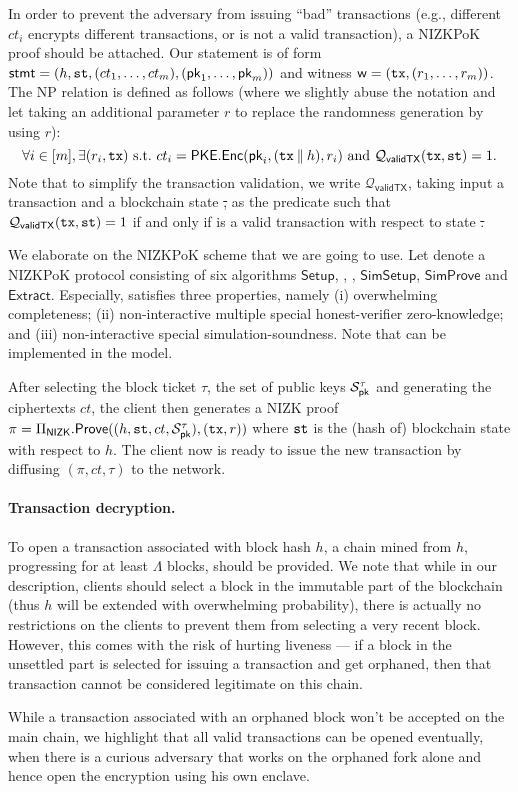 In order to prevent the adversary from issuing ``bad'' transactions (e.g., different $ct_i$ encrypts different transactions, or \tx is not a valid transaction), a NIZKPoK proof should be attached.
%
Our statement is of form $\mathsf{stmt} = (h, \mathtt{st},\allowbreak (ct_1, \ldots, ct_m),\allowbreak (\mathsf{pk}_1, \ldots, \mathsf{pk}_m))$ and witness $\mathsf{w} = (\mathtt{tx}, (r_1, \ldots, r_m))$.
%
The NP relation is defined as follows (where we slightly abuse the notation and let \Enc taking an additional parameter $r$ to replace the randomness generation by using $r$):
%
\begin{equation} \label{eq:nizk-relation}
	\forall i \in [m], \exists (r_i, \mathtt{tx}) ~\mathrm{s.t.}~ ct_i = \mathsf{PKE}.\mathsf{Enc}(\mathsf{pk}_i, (\mathtt{tx} \mathbin\Vert h), r_i)
	~\mathrm{and}~ \mathcal{Q}_{\mathsf{validTX}}(\mathtt{tx}, \mathtt{st}) = 1.
\end{equation}
%
Note that to simplify the transaction validation, we write $\mathcal{Q}_{\mathsf{validTX}}$, taking input a transaction \tx and a blockchain state \st, as the predicate such that $\mathcal{Q}_{\mathsf{validTX}}(\mathtt{tx}, \mathtt{st}) = 1$  if and only if \tx is a valid transaction with respect to state \st.

We elaborate on the NIZKPoK scheme that we are going to use.
%
Let \NIZK denote a NIZKPoK protocol \cite{TCC:LysRos22} consisting of six algorithms $\mathsf{Setup}$, \Prove, \Verify, $\mathsf{SimSetup}$, $\mathsf{SimProve}$ and $\mathsf{Extract}$.
%
Especially, \NIZK satisfies three properties, namely (i) overwhelming completeness; (ii) non-interactive multiple special honest-verifier zero-knowledge; and (iii) non-interactive special simulation-soundness.
%
Note that \NIZK can be implemented in the \funcGrpoRO model.

After selecting the block ticket $\tau$, the set of public keys $\mathcal{S}^\mathsf{\tau}_{\mathsf{pk}}$ and generating the ciphertexts $ct$, the client then generates a NIZK proof $\pi = \Pi_{\mathsf{NIZK}}.\mathsf{Prove}((h,\allowbreak \mathtt{st},\allowbreak ct,\allowbreak \mathcal{S}^\mathsf{\tau}_{\mathsf{pk}}), (\mathtt{tx}, r))$ where $\mathtt{st}$ is the (hash of) blockchain state with respect to $h$.
%
The client now is ready to issue the new transaction by diffusing $(\pi, ct, \tau)$ to the network.

\paragraph{Transaction decryption.}
%
To open a transaction associated with block hash $h$, a chain mined from $h$, progressing for at least $\Lambda$ blocks, should be provided.
%
We note that while in our description, clients should select a block in the immutable part of the blockchain (thus $h$ will be extended with overwhelming probability), there is actually no restrictions on the clients to prevent them from selecting a very recent block.
%
However, this comes with the risk of hurting liveness --- if a block \block in the unsettled part is selected for issuing a transaction and \block get orphaned, then that transaction cannot be considered legitimate on this chain.

While a transaction associated with an orphaned block won't be accepted on the main chain, we highlight that all valid transactions can be opened eventually, when there is a curious adversary that works on the orphaned fork alone and hence open the encryption using his own enclave.
